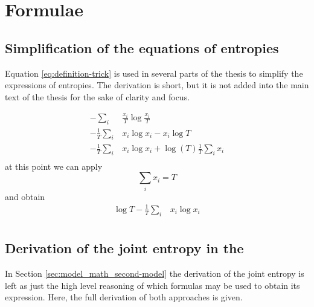 \chapter{Formulae}
\label{cha:app_formulae}


\section{Simplification of the equations of entropies}
\label{sec:app_formulae_trick}

Equation \eqref{eq:definition-trick} is used in several parts of the thesis to simplify the expressions of entropies.
The derivation is short, but it is not added into the main text of the thesis for the sake of clarity and focus.

\begin{align*}
              -\sum_i & \frac{x_i}{T} \log\frac{x_i}{T} \\
  -\frac{1}{T} \sum_i & x_i \log x_i - x_i \log T \\
  -\frac{1}{T} \sum_i & x_i \log x_i + \log(T) \frac{1}{T} \sum_i x_i \\
\end{align*}
at this point we can apply
\begin{equation*}
  \sum_i x_i = T
\end{equation*}
and obtain
\begin{align*}
  \log T - \frac{1}{T} \sum_i & x_i \log x_i\\
\end{align*}

\section{Derivation of the joint entropy in the \secondmodel}
\label{sec:app_formulae_join-entropy_second-model}

In Section \ref{sec:model_math_second-model} the derivation of the joint entropy is left as just the high level reasoning of which formulas may be used to obtain its expression.
Here, the full derivation of both approaches is given.

